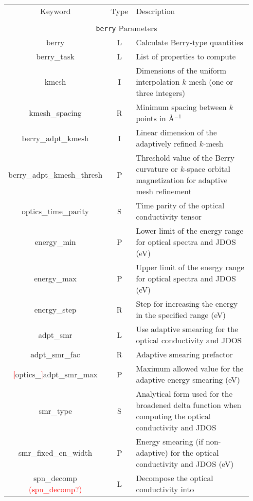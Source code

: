 \begin{table}[hH!]
\begin{center}
\begin{tabular}{|c|c|p{6cm}|}
  \hline
  Keyword & Type & Description \\
  &      &             \\
  \hline\hline
  \multicolumn{3}{|c|}{{\tt berry} Parameters} \\
  \hline
  {\sc berry}  & L & Calculate Berry-type quantities \\
  {\sc berry\_task}& L  & List of properties to compute \\
  {\sc [berry\_]kmesh} & I & Dimensions of the uniform interpolation $k$-mesh 
  (one or three integers)\\ 
  {\sc [berry\_]kmesh\_spacing}& R & Minimum spacing between $k$ points in 
  \AA$^{-1}$\\
  {\sc berry\_adpt\_kmesh} & I & Linear dimension of the adaptively refined 
  $k$-mesh\\ 
  {\sc berry\_adpt\_kmesh\_thresh} & P & Threshold value of the Berry 
  curvature or $k$-space orbital magnetization for adaptive mesh refinement\\ 
  {\sc optics\_time\_parity}& S & Time parity of the optical conductivity tensor\\ 
  {\sc [optics\_]energy\_min} & P & Lower limit of the energy range for
  optical spectra and JDOS (eV) \\
  {\sc [optics\_]energy\_max}& P & Upper limit of the energy range for
  optical spectra and JDOS (eV) \\
  {\sc [optics\_]energy\_step}& R &  Step for increasing the energy in the 
  specified range (eV)\\
  {\sc [optics\_]adpt\_smr} & L & Use adaptive smearing for the 
  optical conductivity and JDOS \\
  {\sc [optics\_]adpt\_smr\_fac} & R & Adaptive smearing prefactor \\
  {\sc \textcolor{red}{[}optics\_\textcolor{red}{]}adpt\_smr\_max} & P & Maximum allowed value for the 
  adaptive energy smearing (eV) \\
  {\sc [optics\_]smr\_type} & S & Analytical form used for the broadened delta function
  when computing the optical conductivity and JDOS\\  
  {\sc [optics\_]smr\_fixed\_en\_width} & P  & Energy smearing (if non-adaptive)
  for the optical conductivity and JDOS (eV) \\
  {\sc spn\_decomp} \textcolor{red}{({\sc [optics\_]spn\_decomp}?)}& L & Decompose the optical conductivity into

\end{tabular}
\end{center}
\end{table}
